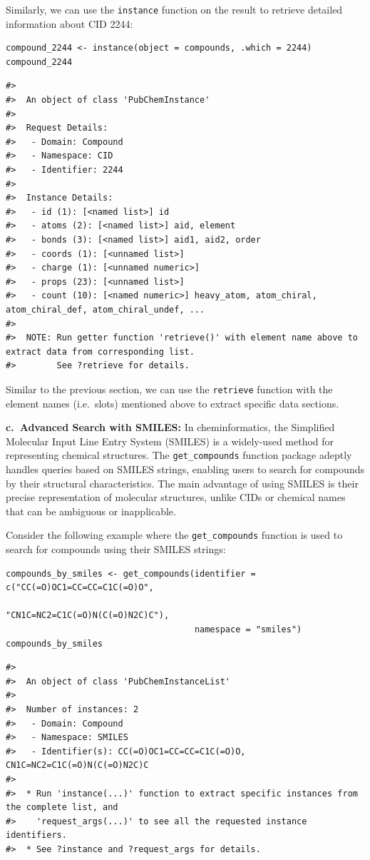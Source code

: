Similarly, we can use the \texttt{instance} function on the result to retrieve detailed information about CID 2244:

\begin{verbatim}
compound_2244 <- instance(object = compounds, .which = 2244)
compound_2244
\end{verbatim}

\begin{verbatim}
#> 
#>  An object of class 'PubChemInstance'
#> 
#>  Request Details:  
#>   - Domain: Compound
#>   - Namespace: CID
#>   - Identifier: 2244
#> 
#>  Instance Details:  
#>   - id (1): [<named list>] id
#>   - atoms (2): [<named list>] aid, element
#>   - bonds (3): [<named list>] aid1, aid2, order
#>   - coords (1): [<unnamed list>] 
#>   - charge (1): [<unnamed numeric>] 
#>   - props (23): [<unnamed list>] 
#>   - count (10): [<named numeric>] heavy_atom, atom_chiral, atom_chiral_def, atom_chiral_undef, ...
#> 
#>  NOTE: Run getter function 'retrieve()' with element name above to extract data from corresponding list. 
#>        See ?retrieve for details.
\end{verbatim}

Similar to the previous section, we can use the \texttt{retrieve} function with the element names (i.e.~slots) mentioned above to extract specific data sections.

\textbf{c.~Advanced Search with SMILES:} In cheminformatics, the Simplified Molecular Input Line Entry System (SMILES) is a widely-used method for representing chemical structures. The \texttt{get\_compounds} function package adeptly handles queries based on SMILES strings, enabling users to search for compounds by their structural characteristics. The main advantage of using SMILES is their precise representation of molecular structures, unlike CIDs or chemical names that can be ambiguous or inapplicable.

Consider the following example where the \texttt{get\_compounds} function is used to search for compounds using their SMILES strings:

\begin{verbatim}
compounds_by_smiles <- get_compounds(identifier = c("CC(=O)OC1=CC=CC=C1C(=O)O", 
                                                    "CN1C=NC2=C1C(=O)N(C(=O)N2C)C"), 
                                     namespace = "smiles")  
compounds_by_smiles
\end{verbatim}

\begin{verbatim}
#> 
#>  An object of class 'PubChemInstanceList'
#> 
#>  Number of instances: 2
#>   - Domain: Compound
#>   - Namespace: SMILES
#>   - Identifier(s): CC(=O)OC1=CC=CC=C1C(=O)O, CN1C=NC2=C1C(=O)N(C(=O)N2C)C
#> 
#>  * Run 'instance(...)' function to extract specific instances from the complete list, and
#>    'request_args(...)' to see all the requested instance identifiers.
#>  * See ?instance and ?request_args for details.
\end{verbatim}

